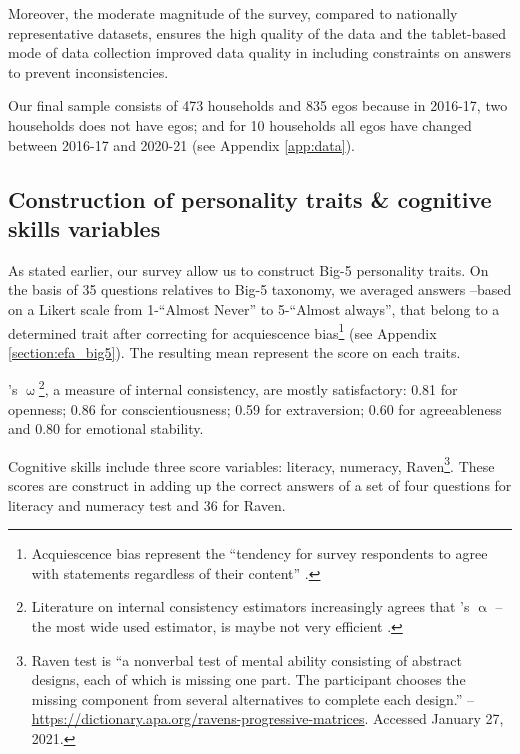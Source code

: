 \documentclass[a4paper, 11pt, onecolumn]{article}
\begin{document}
Moreover, the moderate magnitude of the survey, compared to nationally representative datasets, ensures the high quality of the data and the tablet-based mode of data collection improved data quality in including constraints on answers to prevent inconsistencies. 

Our final sample consists of 473 households and 835 egos because in 2016-17, two households does not have egos; and for 10 households all egos have changed between 2016-17 and 2020-21 (see Appendix \ref{app:data}).







	\subsection{Construction of personality traits \& cognitive skills variables }

As stated earlier, our survey allow us to construct Big-5 personality traits.
On the basis of 35 questions relatives to Big-5 taxonomy, we averaged answers --based on a  Likert scale from 1-``Almost Never'' to 5-``Almost always'', that belong to a determined trait after correcting for acquiescence bias\footnote{Acquiescence bias represent the ``tendency for survey respondents to agree with statements regardless of their content'' \citep{Lavrakas2008}.} (see Appendix \ref{section:efa_big5}).
The resulting mean represent the score on each traits.

\citeauthor{McDonald1999}'s $\upomega$\footnote{Literature on internal consistency estimators increasingly agrees that \citeauthor{Cronbach1951}'s $\upalpha$ --the most wide used estimator, is maybe not very efficient \citep{Bourque2019, TrizanoHermosilla2016}.}, a measure of internal consistency, are mostly satisfactory: 0.81 for openness; 0.86 for conscientiousness; 0.59 for extraversion; 0.60 for agreeableness and 0.80 for emotional stability.

Cognitive skills include three score variables: literacy, numeracy, Raven\footnote{Raven test is ``a nonverbal test of mental ability consisting of abstract designs, each of which is missing one part. The participant chooses the missing component from several alternatives to complete each design.'' -- \url{https://dictionary.apa.org/ravens-progressive-matrices}. Accessed January 27, 2021.}.
These scores are construct in adding up the correct answers of a set of four questions for literacy and numeracy test and 36 for Raven.
\end{document}
